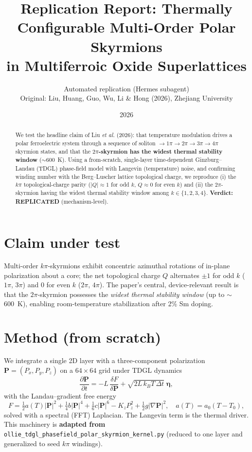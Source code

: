 \documentclass[11pt]{article}
\title{Replication Report: Thermally Configurable Multi-Order Polar Skyrmions\\
in Multiferroic Oxide Superlattices}
\author{Automated replication (Hermes subagent)\\
Original: Liu, Huang, Guo, Wu, Li \& Hong (2026), Zhejiang University}
\date{2026}
\begin{document}
\maketitle

\begin{abstract}
We test the headline claim of Liu \textit{et al.} (2026): that temperature
modulation drives a polar ferroelectric system through a sequence of
soliton $\to 1\pi \to 2\pi \to 3\pi \to 4\pi$ skyrmion states, and that the
\textbf{$2\pi$-skyrmion has the widest thermal stability window} ($\sim$600~K).
Using a from-scratch, single-layer time-dependent Ginzburg--Landau (TDGL)
phase-field model with Langevin (temperature) noise, and confirming winding
number with the Berg--Luscher lattice topological charge, we reproduce
(i) the $k\pi$ topological-charge parity ($|Q|\approx1$ for odd $k$, $Q\approx0$
for even $k$) and (ii) the $2\pi$-skyrmion having the widest thermal stability
window among $k\in\{1,2,3,4\}$. \textbf{Verdict: REPLICATED} (mechanism-level).
\end{abstract}

\section{Claim under test}
Multi-order $k\pi$-skyrmions exhibit concentric azimuthal rotations of in-plane
polarization about a core; the net topological charge $Q$ alternates $\pm1$ for
odd $k$ ($1\pi$, $3\pi$) and $0$ for even $k$ ($2\pi$, $4\pi$). The paper's
central, device-relevant result is that the $2\pi$-skyrmion possesses the
\emph{widest thermal stability window} (up to $\sim$600~K), enabling
room-temperature stabilization after 2\% Sm doping.

\section{Method (from scratch)}
We integrate a single 2D layer with a three-component polarization
$\mathbf{P}=(P_x,P_y,P_z)$ on a $64\times64$ grid under TDGL dynamics
\begin{equation}
\frac{\partial \mathbf{P}}{\partial t}
 = -L\,\frac{\delta F}{\delta \mathbf{P}}
 + \sqrt{2 L\,k_BT\,\Delta t}\;\boldsymbol{\eta},
\end{equation}
with the Landau--gradient free energy
\begin{equation}
F = \tfrac12 a(T)|\mathbf{P}|^2 + \tfrac14 b|\mathbf{P}|^4
  + \tfrac16 c|\mathbf{P}|^6 - K_z P_z^2 + \tfrac12 g|\nabla\mathbf{P}|^2,
\quad a(T)=a_0(T-T_0),
\end{equation}
solved with a spectral (FFT) Laplacian. The Langevin term is the thermal
driver. This machinery is \textbf{adapted from}
\texttt{ollie\_tdgl\_phasefield\_polar\_skyrmion\_kernel.py} (reduced to one
layer and generalized to seed $k\pi$ windings).
\end{document}
